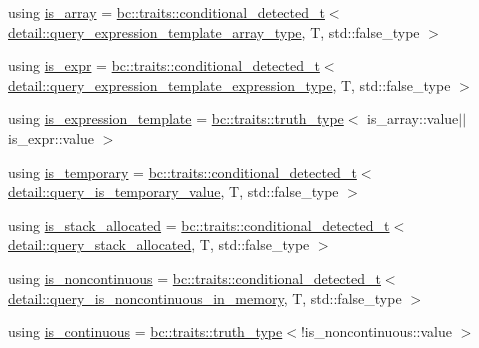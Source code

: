 \begin{DoxyCompactItemize}
\item 
using \hyperlink{structbc_1_1tensors_1_1exprs_1_1expression__traits_a625cfb1838e83a8551e197b56b2ef2e4}{is\+\_\+array} = \hyperlink{namespacebc_1_1traits_a1a6d378947ec32acd457890854bcd592}{bc\+::traits\+::conditional\+\_\+detected\+\_\+t}$<$ \hyperlink{namespacebc_1_1tensors_1_1exprs_1_1detail_a4f6ef9491d82383737761491907159ae}{detail\+::query\+\_\+expression\+\_\+template\+\_\+array\+\_\+type}, T, std\+::false\+\_\+type $>$
\item 
using \hyperlink{structbc_1_1tensors_1_1exprs_1_1expression__traits_aa6285131817b13ba8776a246b318cff4}{is\+\_\+expr} = \hyperlink{namespacebc_1_1traits_a1a6d378947ec32acd457890854bcd592}{bc\+::traits\+::conditional\+\_\+detected\+\_\+t}$<$ \hyperlink{namespacebc_1_1tensors_1_1exprs_1_1detail_a8daec353fcf1440e3e610f412a2228d8}{detail\+::query\+\_\+expression\+\_\+template\+\_\+expression\+\_\+type}, T, std\+::false\+\_\+type $>$
\item 
using \hyperlink{structbc_1_1tensors_1_1exprs_1_1expression__traits_a0495b9445a4aaec1596b5b0c4a05c4c4}{is\+\_\+expression\+\_\+template} = \hyperlink{namespacebc_1_1traits_ac91a9795000ae7f483efbaf74c9872e8}{bc\+::traits\+::truth\+\_\+type}$<$ is\+\_\+array\+::value$\vert$$\vert$is\+\_\+expr\+::value $>$
\item 
using \hyperlink{structbc_1_1tensors_1_1exprs_1_1expression__traits_ab5b69e55697b1e78cf9272ac1e9214a0}{is\+\_\+temporary} = \hyperlink{namespacebc_1_1traits_a1a6d378947ec32acd457890854bcd592}{bc\+::traits\+::conditional\+\_\+detected\+\_\+t}$<$ \hyperlink{namespacebc_1_1tensors_1_1exprs_1_1detail_a78329f6a449e413ac38baeaf0574e64d}{detail\+::query\+\_\+is\+\_\+temporary\+\_\+value}, T, std\+::false\+\_\+type $>$
\item 
using \hyperlink{structbc_1_1tensors_1_1exprs_1_1expression__traits_aab101a01178cf1ed824cb15709429055}{is\+\_\+stack\+\_\+allocated} = \hyperlink{namespacebc_1_1traits_a1a6d378947ec32acd457890854bcd592}{bc\+::traits\+::conditional\+\_\+detected\+\_\+t}$<$ \hyperlink{namespacebc_1_1tensors_1_1exprs_1_1detail_a35543bad82197de0bb8d50c079e7cbaf}{detail\+::query\+\_\+stack\+\_\+allocated}, T, std\+::false\+\_\+type $>$
\item 
using \hyperlink{structbc_1_1tensors_1_1exprs_1_1expression__traits_a2c5c0695ef22b12b53db910f40ff32a4}{is\+\_\+noncontinuous} = \hyperlink{namespacebc_1_1traits_a1a6d378947ec32acd457890854bcd592}{bc\+::traits\+::conditional\+\_\+detected\+\_\+t}$<$ \hyperlink{namespacebc_1_1tensors_1_1exprs_1_1detail_aa6d73fadec8691f52ebcd7254c6ec9bb}{detail\+::query\+\_\+is\+\_\+noncontinuous\+\_\+in\+\_\+memory}, T, std\+::false\+\_\+type $>$
\item 
using \hyperlink{structbc_1_1tensors_1_1exprs_1_1expression__traits_af63d98e5f071259f2b90677629991c2a}{is\+\_\+continuous} = \hyperlink{namespacebc_1_1traits_ac91a9795000ae7f483efbaf74c9872e8}{bc\+::traits\+::truth\+\_\+type}$<$!is\+\_\+noncontinuous\+::value $>$
\end{DoxyCompactItemize}


